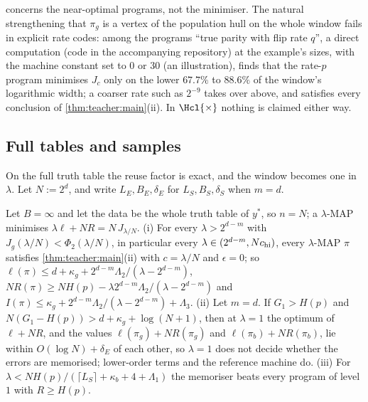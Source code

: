 \begin{remark}\label{rem:teacher:selected}
 concerns the near-optimal programs, not the minimiser. The natural strengthening that $\pi_g$ is a vertex of the population hull on the whole window fails in explicit rate codes: among the programs ``true parity with flip rate $q$'', a direct computation (code in the accompanying repository) at the example's sizes, with the machine constant set to $0$ or $30$ (an illustration), finds that the rate-$p$ program minimises $J_c$ only on the lower $67.7\%$ to $88.6\%$ of the window's logarithmic width; a coarser rate such as $2^{-9}$ takes over above, and satisfies every conclusion of \cref{thm:teacher:main}(ii). In $\Hcl{\times}$ nothing is claimed either way.
\end{remark}

\subsection{Full tables and samples}\label{sec:teacher:more}

On the full truth table the reuse factor is exact, and the window becomes one in $\lambda$. Let $N:=2^d$, and write $L_E,B_E,\delta_E$ for $L_S,B_S,\delta_S$ when $m=d$.

\begin{corollary}\label{cor:teacher:fulltable}
Let $B=\infty$ and let the data be the whole truth table of $y^*$, so $n=N$; a $\lambda$-MAP minimises $\lambda\ell+NR=N\,J_{\lambda/N}$.
(i) For every $\lambda>2^{d-m}$ with $J_g(\lambda/N)<\Phi_2(\lambda/N)$, in particular every $\lambda\in(2^{d-m},Nc_{\rm hi})$, every $\lambda$-MAP $\pi$ satisfies \cref{thm:teacher:main}(ii) with $c=\lambda/N$ and $\epsilon=0$; so $\ell(\pi)\le d+\kappa_g+2^{d-m}\Lambda_2/(\lambda-2^{d-m})$, $NR(\pi)\ge NH(p)-\lambda2^{d-m}\Lambda_2/(\lambda-2^{d-m})$ and $I(\pi)\le\kappa_g+2^{d-m}\Lambda_2/(\lambda-2^{d-m})+\Lambda_3$.
(ii) Let $m=d$. If $G_1>H(p)$ and $N(G_1-H(p))>d+\kappa_g+\log(N+1)$, then at $\lambda=1$ the optimum of $\ell+NR$, and the values $\ell(\pi_g)+NR(\pi_g)$ and $\ell(\pi_b)+NR(\pi_b)$, lie within $O(\log N)+\delta_E$ of each other, so $\lambda=1$ does not decide whether the errors are memorised; lower-order terms and the reference machine do.
(iii) For $\lambda<NH(p)/(\lceil L_S\rceil+\kappa_b+4+\Lambda_1)$ the memoriser beats every program of level $1$ with $R\ge H(p)$.
\end{corollary}

